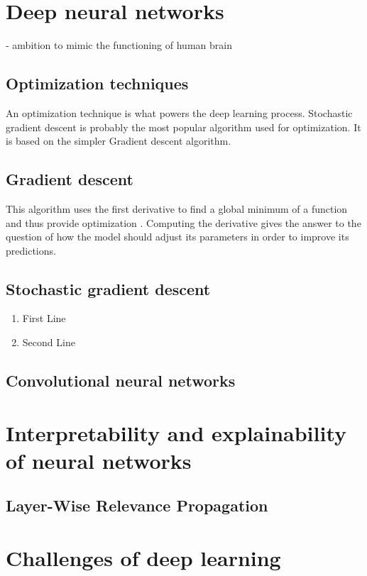 \section{Deep neural networks}
- ambition to mimic the functioning of human brain

\subsection{Optimization techniques}
An optimization technique is what powers the deep learning process. Stochastic gradient descent is probably the most popular algorithm used for optimization. It is based on the simpler Gradient descent algorithm.

\subsection*{Gradient descent}
This algorithm uses the first derivative to find a global minimum of a function and thus provide optimization \cite{deeplearningbook}. Computing the derivative gives the answer to the question of how the model should adjust its parameters in order to improve its predictions.

\subsection*{Stochastic gradient descent}
\begin{enumerate}[label={\arabic*.}]
\vspace{-0.2cm}\item First Line
\vspace{-0.2cm}\item Second Line 
\end{enumerate}

\subsection{Convolutional neural networks}


\section{Interpretability and explainability of neural networks}

\subsection{Layer-Wise Relevance Propagation}



\section{Challenges of deep learning}


